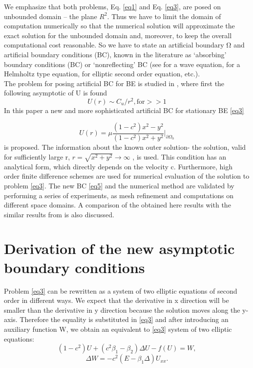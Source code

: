 \documentclass[12pt]{article}
\newcommand{\dO}{\partial\Omega_{h}}
\theoremstyle{theorem}
\theoremstyle{defi}
\begin{document}
We emphasize that both problems, Eq. \ref{eq1} and Eq. \ref{eq3}, are posed on unbounded domain – the plane $R^2$. Thus we have to limit the domain of computation numerically so that the numerical solution will approximate the exact solution for the unbounded domain and, moreover, to keep the overall computational cost reasonable.
So we have to state an artificial boundary $Ω$ and artificial boundary conditions (BC), known in the literature as ‘absorbing’ boundary conditions (BC) or ‘nonreflecting’ BC (see \cite{ref11} for a wave equation, \cite{ref12} for a Helmholtz type equation, \cite{ref13} for elliptic second order equation, etc.). 
\\
The problem for posing artificial BC for BE is studied in \cite{ref6}, where first the following asymptotic of U is found
\begin{equation}
U(r) \sim  C_u/r^2, \text{for} >> 1\label{eq4}
\end{equation}
In this paper a new and more sophisticated artificial BC for stationary BE \ref{eq3}

\begin{equation}
U(r) =  \mu \frac{(1-c^2)x^2 - y^2}{(1-c^2)x^2 + y^2}|_{\dO}  \label{eq5}
\end{equation}
is proposed. The information about the known outer solution- the solution, valid for sufficiently large r, $ r=\sqrt{x^2 + y^2}\rightarrow \infty$  , is used. This condition has an analytical form, which directly depends on the velocity c. Furthermore, high order finite difference schemes are used for numerical evaluation of the solution to problem \ref{eq3}. The new BC \ref{eq5} and the numerical method are validated by performing a series of experiments, as mesh refinement and computations on different space domains. A comparison of the obtained here results with the similar results from  \cite{ref10} is also discussed. 

\section{Derivation of the new asymptotic boundary conditions }

Problem \ref{eq3} can be rewritten as a system of two elliptic equations of second order in different ways. We expect that the derivative   in x direction will be smaller than the derivative   in y direction because the solution moves along the y-axis. Therefore the equality   is substituted in \ref{eq3} and after introducing an auxiliary function W, we obtain an equivalent to \ref{eq3} system of two elliptic equations:
\begin{equation}\label{eq6}
(1-c^2) U + ( c^2\beta_1 -  \beta_2) \Delta U  - f (U) = W, 
\end{equation}
\begin{equation}\label{eq7}
 \Delta W =  - c^2  (E- \beta_1\Delta) U_{xx}. 
\end{equation}
\end{document}
